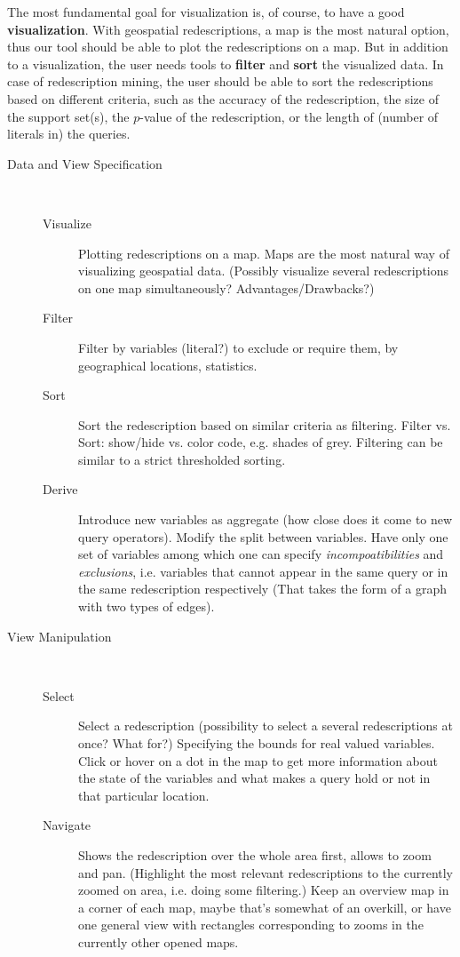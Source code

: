 \documentclass{llncs}
\begin{document}
The most fundamental goal for visualization is, of course, to have a
good \textbf{visualization}. With geospatial redescriptions, a map is the most
natural option, thus our tool should be able to plot the
redescriptions on a map. But in addition to a visualization, the user
needs tools to \textbf{filter} and \textbf{sort} the visualized
data. In case of redescription mining, the user should be able to sort
the redescriptions based on different criteria, such as the accuracy
of the redescription, the size of the support set(s), the $p$-value of
the redescription, or the length of (number of literals in) the
queries. 

\begin{description}
\item[Data and View Specification]~
\begin{description}
\item[Visualize] Plotting redescriptions on a map. Maps are the most natural way of visualizing geospatial data. (Possibly visualize several redescriptions on one map simultaneously? Advantages/Drawbacks?)
 \item[Filter] Filter by variables (literal?) to exclude or require them, by geographical locations, statistics.
\item[Sort] Sort the redescription based on similar criteria as filtering. Filter vs. Sort: show/hide vs. color code, e.g. shades of grey. Filtering can be similar to a strict thresholded sorting.
\item[Derive] Introduce new variables as aggregate  (how close does it come to new query operators). Modify the split between variables. Have only one set of variables among which one can specify \emph{incompoatibilities} and \emph{exclusions}, i.e. variables that cannot appear in the same query or in the same redescription respectively (That takes the form of a graph with two types of edges).
\end{description}
\item[View Manipulation]~
\begin{description}
\item[Select] Select a redescription (possibility to select a several redescriptions at once? What for?) Specifying the bounds for real valued variables. Click or hover on a dot in the map to get more information about the state of the variables and what makes a query hold or not in that particular location.
\item[Navigate] Shows the redescription over the whole area first, allows to zoom and pan. (Highlight the most relevant redescriptions to the currently zoomed on area, i.e. doing some filtering.) Keep an overview map in a corner of each map, maybe that's somewhat of an overkill, or have one general view with rectangles corresponding to zooms in the currently other opened maps.

\end{description}
\end{description}
\end{document}
